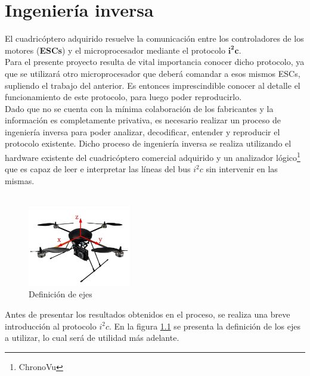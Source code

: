\documentclass[main]{subfiles}
\begin{document}
\chapter{Ingenier\'ia inversa}
\label{chap:ingenieria-inversa}

El cuadric\'optero adquirido resuelve la comunicaci\'on entre los controladores de los motores (\textbf{ESCs}) y el microprocesador mediante el protocolo $\mathbf{i^2c}$.\\

Para el presente proyecto resulta de vital importancia conocer dicho protocolo, ya que se utilizar\'a otro microprocesador que deber\'a comandar a esos mismos ESCs, supliendo el trabajo del anterior. Es entonces imprescindible conocer al detalle el funcionamiento de este protocolo, para luego poder reproducirlo.\\

Dado que no se cuenta con la mínima colaboraci\'on de los fabricantes y la informaci\'on es completamente privativa, es necesario realizar un proceso de ingenier\'ia inversa para poder analizar, decodificar, entender y reproducir el protocolo existente. Dicho proceso de ingenier\'ia inversa se realiza utilizando el hardware existente del cuadric\'optero comercial adquirido y un analizador l\'ogico\footnote{ChronoVu} que es capaz de leer e interpretar las l\'ineas del bus $i^2c$ sin intervenir en las mismas.\\ \\

\begin{figure}
	\vspace{-40pt}
	\begin{center}
	\includegraphics[width=0.4\textwidth]{./pics_sniffer/ejes_quad.jpg}
	\end{center}
	\vspace{-20pt}
	\caption{Definici\'on de ejes}
	\label{fig:ejes_quad}
	\vspace{-70pt}
\end{figure}

Antes de presentar los resultados obtenidos en el proceso, se realiza una breve introducci\'on al protocolo $i^2c$. En la figura \ref{fig:ejes_quad} se presenta la definici\'on de los ejes a utilizar, lo cual ser\'a de utilidad m\'as adelante.
\end{document}
